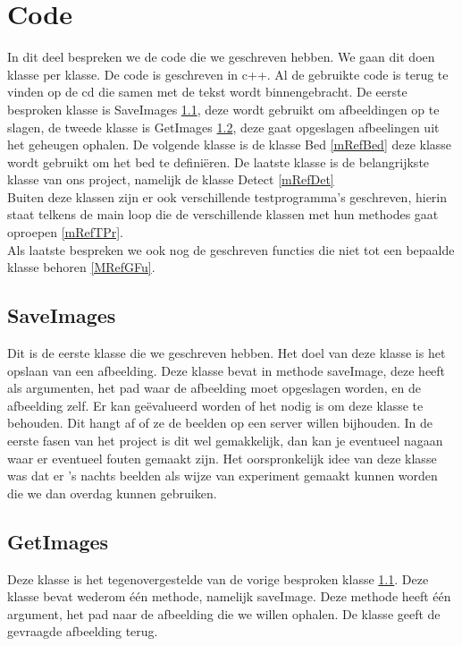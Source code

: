 \section{Code}
\label{mrefCod}
In dit deel bespreken we de code die we geschreven hebben. We gaan dit doen klasse per klasse. De code is geschreven in c++. Al de gebruikte code is terug te vinden op de cd die samen met de tekst wordt binnengebracht. De eerste besproken klasse is SaveImages \ref{mRefSIm}, deze wordt gebruikt om afbeeldingen op te slagen, de tweede klasse is GetImages \ref{mRefGIm}, deze gaat opgeslagen afbeelingen uit het geheugen ophalen. De volgende klasse is de klasse Bed \ref{mRefBed} deze klasse wordt gebruikt om het bed te defini\"eren. De laatste klasse is de belangrijkste klasse van ons project, namelijk de klasse Detect \ref{mRefDet}\\ 
Buiten deze klassen zijn er ook verschillende testprogramma's geschreven, hierin staat telkens de main loop die de verschillende klassen met hun methodes gaat oproepen \ref{mRefTPr}.\\
Als laatste bespreken we ook nog de geschreven functies die niet tot een bepaalde klasse behoren \ref{MRefGFu}.

\subsection{SaveImages}
\label{mRefSIm}
Dit is de eerste klasse die we geschreven hebben. Het doel van deze klasse is het opslaan van een afbeelding. Deze klasse bevat in methode saveImage, deze heeft als argumenten, het pad waar de afbeelding moet opgeslagen worden, en de afbeelding zelf.  
Er kan ge\"evalueerd worden of het nodig is om deze klasse te behouden. Dit hangt af of ze de beelden op een server willen bijhouden. In de eerste fasen van het project is dit wel gemakkelijk, dan kan je eventueel nagaan waar er eventueel fouten gemaakt zijn. 
Het oorspronkelijk idee van deze klasse was dat er 's nachts beelden als wijze van experiment gemaakt kunnen worden die we dan overdag kunnen gebruiken.

\subsection{GetImages}
\label{mRefGIm}
Deze klasse is het tegenovergestelde van de vorige besproken klasse \ref{mRefSIm}. Deze klasse bevat wederom \'e\'en methode, namelijk saveImage. Deze methode heeft \'e\'en argument, het pad naar de afbeelding die we willen ophalen. De klasse geeft de gevraagde afbeelding terug.

